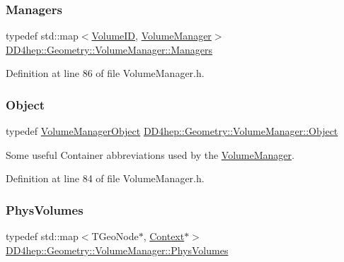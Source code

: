 \subsubsection{\texorpdfstring{Managers}{Managers}}
{\footnotesize\ttfamily typedef std\+::map$<$\hyperlink{class_d_d4hep_1_1_geometry_1_1_volume_manager_ab1f746b561c93be38bc7c6e66fc8ca8a}{Volume\+ID}, \hyperlink{class_d_d4hep_1_1_geometry_1_1_volume_manager}{Volume\+Manager}$>$ \hyperlink{class_d_d4hep_1_1_geometry_1_1_volume_manager_ad60f5618f569c6604861b6e0eb1c71c9}{D\+D4hep\+::\+Geometry\+::\+Volume\+Manager\+::\+Managers}}



Definition at line 86 of file Volume\+Manager.\+h.

\hypertarget{class_d_d4hep_1_1_geometry_1_1_volume_manager_ac464fd441e5c72fb082e8cc6dd0937c4}{}\label{class_d_d4hep_1_1_geometry_1_1_volume_manager_ac464fd441e5c72fb082e8cc6dd0937c4} 
\subsubsection{\texorpdfstring{Object}{Object}}
{\footnotesize\ttfamily typedef \hyperlink{class_d_d4hep_1_1_geometry_1_1_volume_manager_object}{Volume\+Manager\+Object} \hyperlink{class_d_d4hep_1_1_geometry_1_1_volume_manager_ac464fd441e5c72fb082e8cc6dd0937c4}{D\+D4hep\+::\+Geometry\+::\+Volume\+Manager\+::\+Object}}



Some useful Container abbreviations used by the \hyperlink{class_d_d4hep_1_1_geometry_1_1_volume_manager}{Volume\+Manager}. 



Definition at line 84 of file Volume\+Manager.\+h.

\hypertarget{class_d_d4hep_1_1_geometry_1_1_volume_manager_a6dd3900be98a6b11d4c8ab7f59632f36}{}\label{class_d_d4hep_1_1_geometry_1_1_volume_manager_a6dd3900be98a6b11d4c8ab7f59632f36} 
\subsubsection{\texorpdfstring{Phys\+Volumes}{PhysVolumes}}
{\footnotesize\ttfamily typedef std\+::map$<$T\+Geo\+Node$\ast$, \hyperlink{class_d_d4hep_1_1_geometry_1_1_volume_manager_adadb14f2ccbeaad001b7bc6ddb6dc715}{Context}$\ast$$>$ \hyperlink{class_d_d4hep_1_1_geometry_1_1_volume_manager_a6dd3900be98a6b11d4c8ab7f59632f36}{D\+D4hep\+::\+Geometry\+::\+Volume\+Manager\+::\+Phys\+Volumes}}



